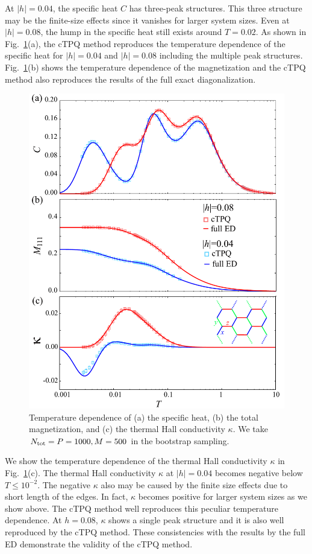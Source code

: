 \documentclass[reprint,amsmath,amssymb,aps,prx]{revtex4-2}
\begin{document}
At $|h|=0.04$, the specific heat $C$ has three-peak structures.
This three structure may be the finite-size effects 
since it vanishes for larger system sizes. %
Even at $|h|=0.08$, the hump in the specific heat 
still exists around $T=0.02$.
As shown in Fig.~\ref{comp_ED}(a),
the cTPQ method reproduces the temperature dependence 
of the specific heat for $|h|=0.04$ and $|h|=0.08$ including
the multiple peak structures.
Fig.~\ref{comp_ED}(b) shows 
the temperature dependence of the magnetization and
the cTPQ method also reproduces the results of the 
full exact diagonalization. 

\begin{figure}[t] 
\begin{center} 
\includegraphics[width=0.9\linewidth]{Figs/compED_4_o.pdf}
\vspace{-0.5cm} 
\caption{Temperature dependence of (a) the specific heat, (b) the total magnetization, and
(c) the thermal Hall conductivity $\kappa$.
We take $N_{\rm tot}=P=1000,M=500$ in the bootstrap sampling.}
\label{comp_ED}
\end{center}
\end{figure}

We show the temperature dependence of the thermal 
Hall conductivity $\kappa$ in Fig.~\ref{comp_ED}(c).
The thermal Hall conductivity $\kappa$ at $|h|=0.04$
becomes negative below $T\leq 10^{-2}$. The negative $\kappa$ also may be 
caused by the finite size effects due to short length of the edges.
In fact, $\kappa$ becomes positive for larger system sizes as we show above.
The cTPQ method well reproduces this peculiar temperature 
dependence. At $h=0.08$, $\kappa$ shows 
a single peak structure and it is also well reproduced by the cTPQ method.
These consistencies with the results by the full ED demonstrate
the validity of the cTPQ method.
\end{document}

